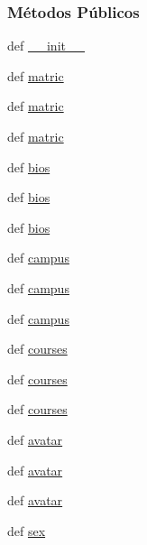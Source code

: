 \subsubsection*{Métodos Públicos}
\begin{DoxyCompactItemize}
\item 
def \hyperlink{classELO_1_1EntityUnit_1_1Student_a8412271826f20d21632dfe81c7305a4a}{\-\_\-\-\_\-init\-\_\-\-\_\-}
\item 
def \hyperlink{classELO_1_1EntityUnit_1_1Student_a010987e0c79f2b3395a0eb8e415e8f48}{matric}
\item 
def \hyperlink{classELO_1_1EntityUnit_1_1Student_a010987e0c79f2b3395a0eb8e415e8f48}{matric}
\item 
def \hyperlink{classELO_1_1EntityUnit_1_1Student_a010987e0c79f2b3395a0eb8e415e8f48}{matric}
\item 
def \hyperlink{classELO_1_1EntityUnit_1_1Student_a7428c9fbf91bc28ee039df54fbf613a3}{bios}
\item 
def \hyperlink{classELO_1_1EntityUnit_1_1Student_a7428c9fbf91bc28ee039df54fbf613a3}{bios}
\item 
def \hyperlink{classELO_1_1EntityUnit_1_1Student_a7428c9fbf91bc28ee039df54fbf613a3}{bios}
\item 
def \hyperlink{classELO_1_1EntityUnit_1_1Student_ab4085f71869b2d0b5124f3f3ac216b2c}{campus}
\item 
def \hyperlink{classELO_1_1EntityUnit_1_1Student_ab4085f71869b2d0b5124f3f3ac216b2c}{campus}
\item 
def \hyperlink{classELO_1_1EntityUnit_1_1Student_ab4085f71869b2d0b5124f3f3ac216b2c}{campus}
\item 
def \hyperlink{classELO_1_1EntityUnit_1_1Student_a80c6bab040d61102a1ddb1bc0ddaab38}{courses}
\item 
def \hyperlink{classELO_1_1EntityUnit_1_1Student_a80c6bab040d61102a1ddb1bc0ddaab38}{courses}
\item 
def \hyperlink{classELO_1_1EntityUnit_1_1Student_a80c6bab040d61102a1ddb1bc0ddaab38}{courses}
\item 
def \hyperlink{classELO_1_1EntityUnit_1_1Student_adcb290317bcd8aab23370b17c42d26fb}{avatar}
\item 
def \hyperlink{classELO_1_1EntityUnit_1_1Student_adcb290317bcd8aab23370b17c42d26fb}{avatar}
\item 
def \hyperlink{classELO_1_1EntityUnit_1_1Student_adcb290317bcd8aab23370b17c42d26fb}{avatar}
\item 
def \hyperlink{classELO_1_1EntityUnit_1_1Student_a358998b764eed85c81244ee43792f762}{sex}

\end{DoxyCompactItemize}
